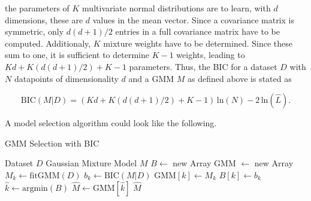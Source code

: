the parameters of $K$ multivariate normal distributions are to learn, with $d$ dimensions, these are $d$ values in the mean vector.  Since a covariance matrix is symmetric, only $d(d+1)/2$ entries in a full covariance matrix have to be computed. Additionaly, $K$ mixture weights have to be determined. Since these sum to one, it is sufficient to determine $K-1$ weights, leading to $Kd + K(d(d+1)/2)+K-1$ parameters. Thus, the BIC for a dataset $D$ with $N$ datapoints of dimensionality $d$ and a GMM $M$ as defined above is stated as 

\begin{equation}
    \text{BIC}(M|D) = (Kd + K(d(d+1)/2)+K-1) \, \text{ln}(N) - 2 \, \text{ln}(\hat{L}).
\end{equation}

A model selection algorithm could look like the following.

\begin{algorithm}
    \caption{GMM Selection with BIC}
    \label{alg:gmm_selection_bic}
 
    \begin{algorithmic}[1]
        \REQUIRE Dataset $D$
        \ENSURE Gaussian Mixture Model $M$
        \STATE $B \leftarrow$ new Array
        \STATE GMM $\leftarrow$ new Array
            \STATE $M_k \leftarrow \text{fitGMM}(D)$
            \STATE $b_k \leftarrow \text{BIC}(M|D)$
            \STATE GMM$[k] \leftarrow M_k$
            \STATE $B[k] \leftarrow b_k$
        \ENDFOR
        \STATE $\hat{k} \leftarrow \text{argmin}(B)$
        \STATE $\hat{M} \leftarrow \text{GMM}[\hat{k}]$
        \RETURN $\hat{M}$

        
    \end{algorithmic}
 \end{algorithm}